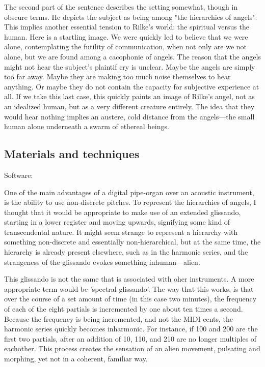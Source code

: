 \documentclass[12pt,twoside,maitrise]{dms_ks}
\theoremstyle{definition}
\begin{document}
The second part of the sentence describes the setting somewhat, though in obscure terms.
He depicts the subject as being among "the hierarchies of angels".
This implies another essential tension to Rilke's world: the spiritual versus the human.
Here is a startling image.
We were quickly led to believe that we were alone, contemplating the futility of communication, when not only are we not alone, but we are found among a cacophonie of angels.
The reason that the angels might not hear the subject's plaintif cry is unclear. 
Maybe the angels are simply too far away.
Maybe they are making too much noise themselves to hear anything.
Or maybe they do not contain the capacity for subjective experience at all.
If we take this last case, this quickly paints an image of Rilke's angel, not as an idealized human, but as a very different creature entirely.
The idea that they would hear nothing implies an austere, cold distance from the angels---the small human alone underneath a swarm of ethereal beings.

\subsection{Materials and techniques}

Software:

One of the main advantages of a digital pipe-organ over an acoustic instrument, is the ability to use non-discrete pitches.
To represent the hierarchies of angels, I thought that it would be appropriate to make use of an extended glissando, starting in a lower register and moving upwards, signifying some kind of transcendental nature.
It might seem strange to represent a hierarchy with something non-discrete and essentially non-hierarchical, but at the same time, the hierarchy is already present elsewhere, such as in the harmonic series, and the strangeness of the glissando evokes something inhuman---alien.

This glissando is not the same that is associated with oher instruments. A more appropriate term would be 'spectral glissando'. The way that this works, is that over the course of a set amount of time (in this case two minutes), the frequency of each of the eight partials is incremented by one about ten times a second.
Because the frequency is being incremented, and not the MIDI cents, the harmonic series quickly becomes inharmonic.
For instance, if 100 and 200 are the first two partials, after an addition of 10, 110, and 210 are no longer multiples of eachother.
This process creates the sensation of an alien movement, pulsating and morphing, yet not in a coherent, familiar way.    
\end{document}
